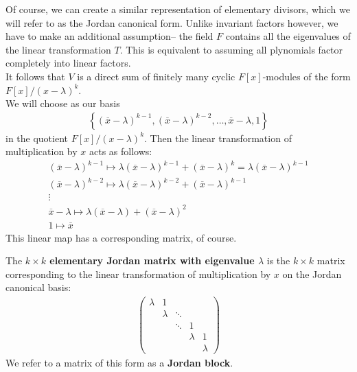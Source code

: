 \documentclass{memoir}
\begin{document}



Of course, we can create a similar representation of elementary divisors, which we will refer to as the Jordan canonical form. Unlike invariant factors however, we have to make an additional assumption-- the field \(F\) contains all the eigenvalues of the linear transformation \(T\). This is equivalent to assuming all plynomials factor completely into linear factors.\\

It follows that \(V\) is a direct sum of finitely many cyclic  \(F[x]\)-modules of the form \(F[x] / (x-\lambda)^{k}\).\\

We will choose as our basis
\begin{align*}
	\left\{ (\overline{x}-\lambda )^{k-1}, (\overline{x}-\lambda )^{k-2}, \ldots, \overline{x}-\lambda , 1 \right\} 
\end{align*}
in the quotient \(F[x] / (x-\lambda)^{k}\). Then the linear transformation of multiplication by \(x\) acts as follows:
\begin{align*}
	(\overline{x}-\lambda )^{k-1} \mapsto \lambda (\overline{x}-\lambda)^{k-1} + (\overline{x}-\lambda)^{k} = \lambda (\overline{x}-\lambda)^{k-1}\\
	(\overline{x}-\lambda )^{k-2}\mapsto \lambda (\overline{x}-\lambda)^{k-2} + (\overline{x}-\lambda)^{k-1}\\
	\vdots\\
	\overline{x}-\lambda \mapsto \lambda (\overline{x}-\lambda ) + (\overline{x}-\lambda)^2\\
	1 \mapsto \overline{x}
\end{align*}
This linear map has a corresponding matrix, of course.

\begin{defn}
	The \textbf{\(k\times k\) elementary Jordan matrix with eigenvalue \(\lambda \)} is the \(k\times k\) matrix corresponding to the linear transformation of multiplication by \(x\) on the Jordan canonical basis:
	\begin{align*}
		\begin{pmatrix} 
			\lambda & 1 & & & \\
				& \lambda  & \ddots & &\\
			  &  & \ddots & 1 & \\
			  &  &   & \lambda & 1\\
			  & & & & \lambda 
		\end{pmatrix} 
	\end{align*}
	We refer to a matrix of this form as a \textbf{Jordan block}.
\end{defn}
\end{document}

